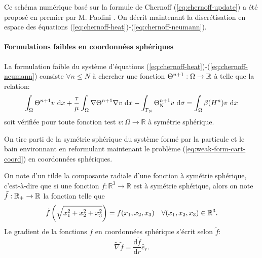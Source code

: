 Ce schéma numérique basé sur la formule de Chernoff
(\ref{eq:chernoff-update}) a été proposé en premier par M. Paolini
\cite{Paolini1988}. On décrit maintenant la discrétisation en
espace des équations (\ref{eq:chernoff-heat})-(\ref{eq:chernoff-neumann}).


\paragraph{Formulations faibles en coordonnées sphériques}
La formulation faible du système d'équations
(\ref{eq:chernoff-heat})-(\ref{eq:chernoff-neumann}) consiste $\forall
n\leq N$ à chercher une fonction $\Theta^{n+1}:\Omega\to\mathbb R$
à telle que la relation:
\begin{equation}\label{eq:weak-form-cart-coord}
  \int_\Omega \temperature^{n+1} v\,\intd{x} + \frac{\tau}{\mu} %
  \int_\Omega \nabla \temperature^{n+1} \nabla v\,\intd{x} - %
  \int_{\Gamma_\mathrm{N}} \temperature^{n+1}_\mathrm{N} v\,\intd{\sigma} %
  = \int_\Omega \beta(\enthalpydensity^n)v\,\intd{x}
\end{equation}
soit vérifiée pour toute fonction test $v:\Omega\to\mathbb R$ à
symétrie sphérique.

On tire parti de la symétrie sphérique du système formé par la
particule et le bain environnant en reformulant maintenant le
problème (\ref{eq:weak-form-cart-coord}) en coordonnées sphériques.


On note d'un tilde la composante radiale d'une fonction à symétrie
sphérique, c'est-à-dire que si une fonction $f:\mathbb
R^3\to\mathbb R$ est à symétrie sphérique, alors on note $\tilde
f:\mathbb {\mathbb R_+}\to\mathbb R$ la fonction telle que
\begin{equation}\label{eq:spherical-symmetry}
  \tilde f\left( \sqrt{x_1^2 + x_2^2 + x_3^2} \right) = f(x_1, x_2,
  x_3)\quad \forall(x_1, x_2,x_3)\in\mathbb R^3.
\end{equation}
Le gradient de la fonctions $f$ en coordonnées sphérique s'écrit selon
$\tilde f$:
\begin{equation}\label{eq:spherical-gradient}
  \tilde\nabla\tilde f = \frac{\mathrm d\tilde f}{\mathrm dr}\hat e_r.
\end{equation}

